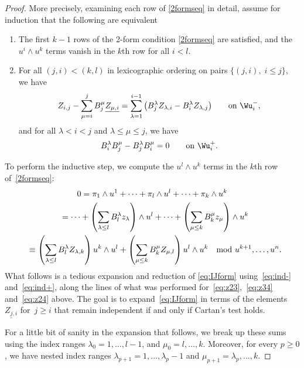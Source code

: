 \begin{proof}
More precisely, examining each row of \eqref{2formseq} in detail, assume for induction that the following are equivalent
\begin{enumerate}\itemsep=0pt
\item The f\/irst $k-1$ rows of the 2-form condition
\eqref{2formseq} are satisf\/ied, and the $u^i \wedge u^k$ terms vanish in the
$k$th row for all $i < l$.
\item For all $(j,i)  < (k,l)$ in lexicographic ordering on
pairs $\{ (j,i),\; i \leq j\}$, we have
\begin{gather}
   Z_{i,j} - \sum_{\mu=i}^jB^{\mu}_{j} \underline{Z_{\mu,i}} = \sum_{\lambda=1}^{i-1} \big( B^{\lambda}_{j}
   Z_{\lambda,i} - B^{\lambda}_{i} Z_{\lambda,j}\big) \qquad \text{on $\Wu^-_i$},
   \label{eq:ind-}
\end{gather}
and for all $\lambda <i < j$ and $\lambda \leq \mu \leq j$, we have
\begin{gather}
B^\lambda_i B^\mu_j - B^\lambda_j B^\mu_i=0 \qquad \text{on $\Wu^+_i$}.
\label{eq:ind+}
\end{gather}
\end{enumerate}


To perform the inductive step, we compute the $u^l \wedge u^k$ terms in the $k$th row of~\eqref{2formseq}:
\begin{gather}
0  =  \pi_1 \wedge u^1 + \cdots + \pi_l \wedge u^l +\cdots+ \pi_k \wedge u^k \nonumber\\
 \hphantom{0}{}  = \cdots + \left( \sum_{\lambda \leq l} B^{\lambda}_l z_{\lambda}
  \right) \wedge u^l + \cdots +  \left( \sum_{\mu\leq k} B^\mu_k z_\mu\right) \wedge u^k \nonumber\\
 \hphantom{0}{}
 \equiv  \left( \sum_{\lambda \leq l} B^{\lambda}_l Z_{\lambda,k}
  \right) u^k \wedge u^l  +  \left( \sum_{\mu\leq k} B^\mu_k
  Z_{\mu,l}\right) u^l \wedge u^k \
  \mod u^{k+1}, \ldots, u^n.
\label{eq:IJform}
\end{gather}
What follows is a tedious expansion and reduction of \eqref{eq:IJform} using~\eqref{eq:ind-} and~\eqref{eq:ind+}, along
the lines of what was performed for~\eqref{eq:z23},~\eqref{eq:z34} and~\eqref{eq:z24} above.  The goal is to expand~\eqref{eq:IJform} in terms of
the elements~$\underline{Z_{j,i}}$ for~$j \geq i$ that remain independent if
and only if Cartan's test holds.

For a little bit of sanity in the expansion that follows, we break up these
sums using the index ranges $\lambda_0 = 1, \ldots, l-1$, and $\mu_0 = l,
\ldots, k$.  Moreover, for every $p\geq 0$, we have nested index ranges $\lambda_{p+1}
= 1, \ldots, \lambda_{p}-1$ and $\mu_{p+1} = \lambda_p, \ldots, k$.


\end{proof}
